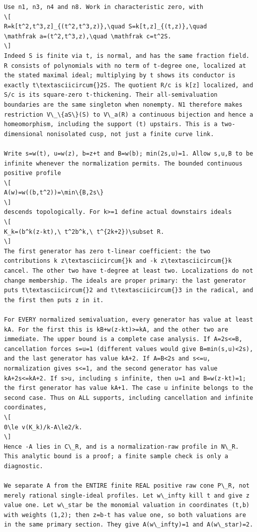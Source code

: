 \documentclass[11pt]{article}
\begin{document}
\begin{Verbatim}[fontsize=\tiny,breaklines=true,breakanywhere=true]
Use n1, n3, n4 and n8. Work in characteristic zero, with
\[
R=k[t^2,t^3,z]_{(t^2,t^3,z)},\quad S=k[t,z]_{(t,z)},\quad
\mathfrak a=(t^2,t^3,z),\quad \mathfrak c=t^2S.
\]
Indeed S is finite via t, is normal, and has the same fraction field. R consists of polynomials with no term of t-degree one, localized at the stated maximal ideal; multiplying by t shows its conductor is exactly t\textasciicircum{}2S. The quotient R/c is k[z] localized, and S/c is its square-zero t-thickening. Their all-semivaluation boundaries are the same singleton when nonempty. N1 therefore makes restriction V\_\{aS\}(S) to V\_a(R) a continuous bijection and hence a homeomorphism, including the support (t) upstairs. This is a two-dimensional nonisolated cusp, not just a finite curve link.

Write s=w(t), u=w(z), b=z+t and B=w(b); min(2s,u)=1. Allow s,u,B to be infinite whenever the normalization permits. The bounded continuous positive profile
\[
A(w)=w((b,t^2))=\min\{B,2s\}
\]
descends topologically. For k>=1 define actual downstairs ideals
\[
K_k=(b^k(z-kt),\ t^2b^k,\ t^{2k+2})\subset R.
\]
The first generator has zero t-linear coefficient: the two contributions k z\textasciicircum{}k and -k z\textasciicircum{}k cancel. The other two have t-degree at least two. Localizations do not change membership. The ideals are proper primary: the last generator puts t\textasciicircum{}2 and t\textasciicircum{}3 in the radical, and the first then puts z in it.

For EVERY normalized semivaluation, every generator has value at least kA. For the first this is kB+w(z-kt)>=kA, and the other two are immediate. The upper bound is a complete case analysis. If A=2s<=B, cancellation forces s=u=1 (different values would give B=min(s,u)<2s), and the last generator has value kA+2. If A=B<2s and s<=u, normalization gives s<=1, and the second generator has value kA+2s<=kA+2. If s>u, including s infinite, then u=1 and B=w(z-kt)=1; the first generator has value kA+1. The case u infinite belongs to the second case. Thus on ALL supports, including cancellation and infinite coordinates,
\[
0\le v(K_k)/k-A\le2/k.
\]
Hence -A lies in C\_R, and is a normalization-raw profile in N\_R. This analytic bound is a proof; a finite sample check is only a diagnostic.

We separate A from the ENTIRE finite REAL positive raw cone P\_R, not merely rational single-ideal profiles. Let w\_infty kill t and give z value one. Let w\_star be the monomial valuation in coordinates (t,b) with weights (1,2); then z=b-t has value one, so both valuations are in the same primary section. They give A(w\_infty)=1 and A(w\_star)=2.


\end{Verbatim}
\end{document}

